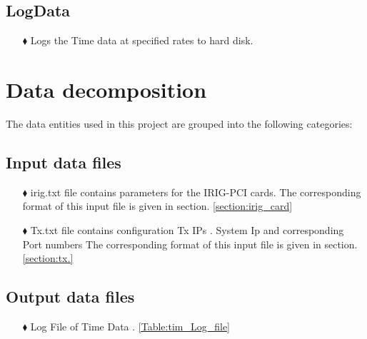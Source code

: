    \subsection{LogData}
      \begin{enumerate}
   	\item [$\blacklozenge$] Logs the Time data at specified rates to hard disk.
   \end{enumerate}

\section{Data decomposition}

The data entities used in this project are grouped into the following categories:
       \subsection{Input data files} 
       
        \begin{enumerate}
        \item [$\blacklozenge$] irig.txt file contains parameters for the IRIG-PCI cards. The corresponding format of this input file is given in section. \ref{section:irig_card} 
       	
       	\item [$\blacklozenge$] Tx.txt file contains configuration Tx IPs . System Ip and corresponding Port numbers The corresponding format of this input file is given in section. \ref{section:tx.} 
       	
       \end{enumerate}	
	
       \subsection{Output data files} 
       
       \begin{enumerate}
       	\item [$\blacklozenge$] Log File of Time Data 
       	. \ref{Table:tim_Log_file}
       	
       \end{enumerate}		